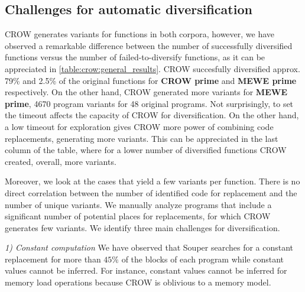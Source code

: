 
%



\subsection{Challenges for automatic diversification}

CROW generates variants for functions in both corpora, however, we have observed a remarkable difference between the number of successfully diversified functions versus the number of failed-to-diversify functions, as it can be appreciated in \autoref{table:crow:general_results}. CROW succesfully diversified approx. 79\% and 2.5\% of the original functions for \textbf{CROW prime} and  \textbf{MEWE prime} respectively. On the other hand, CROW generated more variants for \textbf{MEWE prime}, 4670 program variants for 48 original programs. Not surprisingly, to set the timeout affects the capacity of CROW for diversification. On the other hand, a low timeout for exploration gives CROW more power of combining code replacements, generating more variants. This can be appreciated in the last column of the table, where for a lower number of diversified functions CROW created, overall, more variants.


Moreover, we look at the cases that yield a few variants per function. There is no direct correlation between the number of identified code for replacement and the number of unique variants. We manually analyze programs that include a significant number of potential places for replacements, for which CROW generates few variants. 
We identify three main challenges for diversification.

\emph{1) Constant computation}  We have observed that Souper searches for a constant replacement for more than $45\%$ of the blocks of each program while constant values cannot be inferred. For instance,  constant values cannot be inferred for memory load operations because CROW is oblivious to a memory model. 

